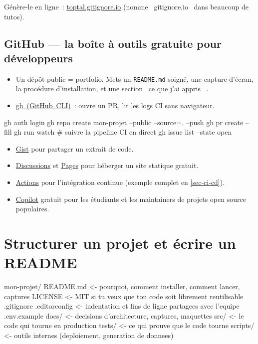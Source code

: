 \documentclass[12pt,a4paper,twoside,openright]{book}
\newcommand{\fichier}[1]{\texttt{\color{pathgreen}#1}}
\newcommand{\link}[2]{\href{#2}{#1}}
\begin{document}
G\'en\`ere-le en ligne~: \link{toptal.gitignore.io}{https://www.toptal.com/developers/gitignore}
(nomme \og ~gitignore.io~ \fg{} dans beaucoup de tutos).

\subsection{GitHub --- la bo\^ite \`a outils gratuite pour d\'eveloppeurs}

\begin{itemize}
  \item Un d\'ep\^ot public = portfolio. Mets un \fichier{README.md} soign\'e, une capture d'\'ecran,
        la proc\'edure d'installation, et une section \og ~ce que j'ai appris~ \fg{}.
  \item \link{gh~(GitHub~CLI)}{https://cli.github.com/}~: ouvre un PR, lit les logs CI sans navigateur.
\end{itemize}

\begin{terminal}
gh auth login
gh repo create mon-projet --public --source=. --push
gh pr create --fill
gh run watch                  # suivre la pipeline CI en direct
gh issue list --state open
\end{terminal}

\begin{itemize}
  \item \link{Gist}{https://gist.github.com/} pour partager un extrait de code.
  \item \link{Discussions}{https://docs.github.com/en/discussions} et
        \link{Pages}{https://pages.github.com/} pour h\'eberger un site statique gratuit.
  \item \link{Actions}{https://github.com/features/actions} pour l'int\'egration continue
        (exemple complet en \cref{sec-ci-cd}).
  \item \link{Copilot}{https://github.com/features/copilot} gratuit pour les \'etudiants et
        les maintainers de projets open source populaires.
\end{itemize}

\section{Structurer un projet et \'ecrire un README}

\begin{codeplain}
mon-projet/
  README.md            <- pourquoi, comment installer, comment lancer, captures
  LICENSE              <- MIT si tu veux que ton code soit librement reutilisable
  .gitignore
  .editorconfig        <- indentation et fins de ligne partagees avec l'equipe
  .env.example
  docs/                <- decisions d'architecture, captures, maquettes
  src/                 <- le code qui tourne en production
  tests/               <- ce qui prouve que le code tourne
  scripts/             <- outils internes (deploiement, generation de donnees)
\end{codeplain}
\end{document}
